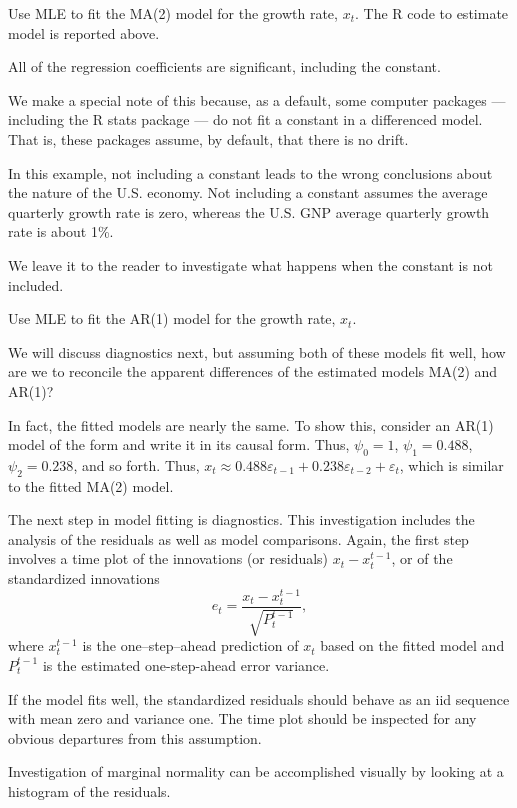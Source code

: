 \documentclass[
paper=128mm:96mm, %
fontsize=9.5pt, %
pagesize, %
parskip=half-, %
]{scrartcl} %
\theoremstyle{mythmstyle} %
\begin{document}
Use MLE to fit the MA(2) model for the growth rate, $x_t$. The R code to estimate model is reported 
above.

All of the regression coefficients are significant, including the constant. 

We make a special note of this because, as a default, some computer packages --- including the R stats package --- do not fit a constant in a differenced model. That is, these packages assume, by default, that there is no drift. 

In this example, not including a constant leads to the wrong conclusions about the nature of the U.S. economy. Not including a constant assumes the average quarterly growth rate is zero, whereas the U.S. GNP average quarterly growth rate is about 1\%. 

We leave it to the reader to investigate what happens when the constant is not included.
\clearpage

Use MLE to fit the AR(1) model for the growth rate, $x_t$.

We will discuss diagnostics next, but assuming both of these models fit well, how are we to reconcile the apparent differences of the estimated models MA(2) and AR(1)?

In fact, the fitted models are nearly the same. To show this, consider an AR(1) model of the form and write it in its causal form. Thus, $\psi_0=1$, $\psi_1=0.488$, $\psi_2= 0.238$, and so forth. Thus,
$x_t\approx 0.488\varepsilon_{t-1} + 0.238\varepsilon_{t-2} + \varepsilon_t$, which is similar to the fitted MA(2) model.
\clearpage


The next step in model fitting is diagnostics. This investigation includes the analysis of the residuals as well as model comparisons. Again, the first step involves a time plot of the innovations (or residuals) $x_t-x_{t}^{t-1}$, or of the standardized innovations
%
\begin{equation}
\widehat{e}_t=\frac{x_t-x_{t}^{t-1}}{\sqrt{P_t^{t-1}}},\nonumber
\end{equation}
%
where $x_{t}^{t-1}$ is the one--step--ahead prediction of $x_t$ based on the fitted model and $P_t^{t-1}$ is the estimated one-step-ahead error variance.

If the model fits well, the standardized residuals should behave as an iid sequence with mean zero and variance one. The time plot should be inspected for any obvious departures from this assumption.

Investigation of marginal normality can be accomplished visually by looking at a histogram of the residuals. 
\clearpage
\end{document}
